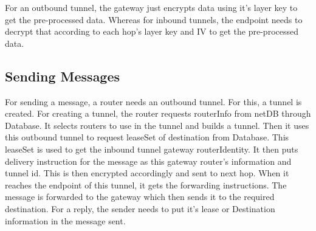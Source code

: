 \documentclass{main}
\begin{document}
For an outbound tunnel, the gateway just encrypts data using it's layer key to get the pre-processed data. Whereas for inbound
tunnels, the endpoint needs to decrypt that according to each hop's layer key and IV to get the pre-processed data.
\subsection{Sending Messages}
For sending a message, a router needs an outbound tunnel. For this, a tunnel is created. For creating a tunnel, the
router requests routerInfo from netDB through Database. It selects routers to use in the tunnel and builds a tunnel.
Then it uses this outbound tunnel to request leaseSet of destination from Database. This leaseSet is used to get 
the inbound tunnel gateway routerIdentity. It then puts delivery instruction for the message as this gateway router's
information and tunnel id. This is then encrypted accordingly and sent to next hop. When it reaches the endpoint of this
tunnel, it gets the forwarding instructions. The message is forwarded to the gateway which then sends it to the required 
destination. For a reply, the sender needs to put it's lease or Destination information in the message sent.
\end{document}
